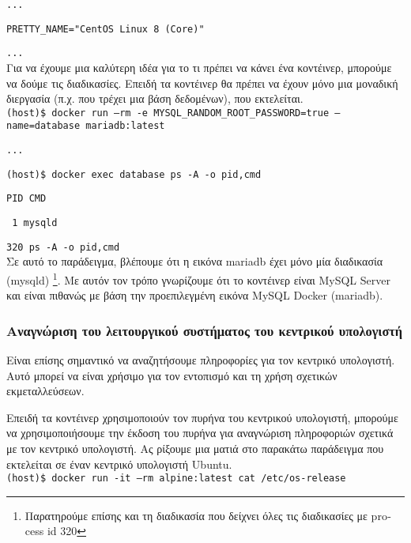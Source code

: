 \texttt{\textlatin{...}}

\texttt{\textlatin{PRETTY\_NAME="CentOS Linux 8 (Core)"}}

\texttt{\textlatin{...}} \\

Για να έχουμε μια καλύτερη ιδέα για το τι πρέπει να κάνει ένα κοντέινερ,
μπορούμε να δούμε τις διαδικασίες. Επειδή τα κοντέινερ θα πρέπει να έχουν μόνο
μια μοναδική διεργασία (π.χ. που τρέχει μια βάση δεδομένων), που εκτελείται. \\

\texttt{\textlatin{(host)\$ docker run --rm -e MYSQL\_RANDOM\_ROOT\_PASSWORD=true --name=database mariadb:latest}}

\texttt{\textlatin{...}}

\texttt{\textlatin{(host)\$ docker exec database ps -A -o pid,cmd}}

\texttt{\textlatin{PID CMD}}

\texttt{\textlatin{   1 mysqld}}

\texttt{\textlatin{320 ps -A -o pid,cmd}} \\


Σε αυτό το παράδειγμα, βλέπουμε ότι η εικόνα \textlatin{mariadb} έχει μόνο μία
διαδικασία \textlatin{(mysqld)} \footnote{Παρατηρούμε επίσης και τη διαδικασία
που δείχνει όλες τις διαδικασίες με \textlatin{process id 320}}. Με αυτόν τον
τρόπο γνωρίζουμε ότι το κοντέινερ είναι \textlatin{MySQL Server} και είναι
πιθανώς με βάση την προεπιλεγμένη εικόνα \textlatin{MySQL Docker (mariadb)}.

\subsubsection{Αναγνώριση του λειτουργικού συστήματος του κεντρικού υπολογιστή}

Είναι επίσης σημαντικό να αναζητήσουμε πληροφορίες για τον κεντρικό υπολογιστή.
Αυτό μπορεί να είναι χρήσιμο για τον εντοπισμό και τη χρήση σχετικών
εκμεταλλεύσεων.

Επειδή τα κοντέινερ χρησιμοποιούν τον πυρήνα του κεντρικού υπολογιστή, μπορούμε
να χρησιμοποιήσουμε την έκδοση του πυρήνα για αναγνώριση πληροφοριών σχετικά με
τον κεντρικό υπολογιστή. Ας ρίξουμε μια ματιά στο παρακάτω παράδειγμα που
εκτελείται σε έναν κεντρικό υπολογιστή \textlatin{Ubuntu}. \\

\texttt{\textlatin{(host)\$ docker run -it --rm alpine:latest cat /etc/os-release}}


